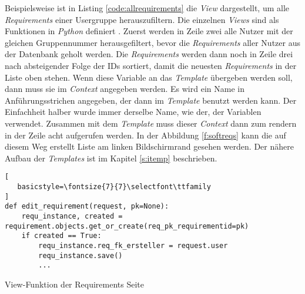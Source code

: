 \documentclass[11pt,a4paper]{report}
\begin{document}
Beispielsweise ist in Listing \ref{code:allrequirements} die \textit{View} dargestellt, um alle \textit{Requirements} einer Usergruppe herauszufiltern. Die einzelnen \textit{Views} sind als Funktionen in \textit{Python} definiert \cite{mozillatuto1}. Zuerst werden in Zeile zwei alle Nutzer mit der gleichen Gruppennummer herausgefiltert, bevor die \textit{Requirements} aller Nutzer aus der Datenbank geholt werden. Die \textit{Requirements} werden dann noch in Zeile drei nach absteigender Folge der IDs sortiert, damit die neuesten \textit{Requirements} in der Liste oben stehen. Wenn diese Variable an das \textit{Template} übergeben werden soll, dann muss sie im \textit{Context} angegeben werden. Es wird ein Name in Anführungsstrichen angegeben, der dann im \textit{Template} benutzt werden kann. Der Einfachheit halber wurde immer derselbe Name, wie der, der Variablen verwendet. Zusammen mit dem \textit{Template} muss dieser \textit{Context} dann zum rendern in der Zeile acht aufgerufen werden. In der Abbildung \ref{f:softreqs} kann die auf diesem Weg erstellt Liste am linken Bildschirmrand gesehen werden. Der nähere Aufbau der \textit{Templates} ist im Kapitel \ref{s:itemp} beschrieben.




\begin{listing}[htbp]
\begin{lstlisting}[
   basicstyle=\fontsize{7}{7}\selectfont\ttfamily
]
def edit_requirement(request, pk=None):
    requ_instance, created = requirement.objects.get_or_create(req_pk_requirementid=pk)
    if created == True:
        requ_instance.req_fk_ersteller = request.user
        requ_instance.save()
        ...
\end{lstlisting}
\caption{View-Funktion der Requirements Seite}
\label{code:editreq}
\end{listing}
\end{document}
